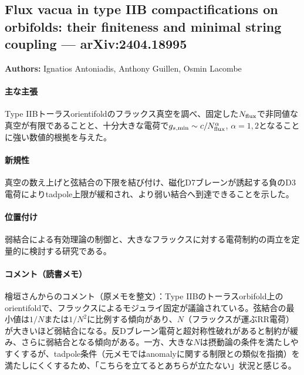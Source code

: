 \subsection{Flux vacua in type IIB compactifications on orbifolds: their finiteness and minimal string coupling --- arXiv:2404.18995}

\textbf{Authors:} Ignatios Antoniadis, Anthony Guillen, Osmin Lacombe

\paragraph{主な主張}
Type IIBトーラスorientifoldのフラックス真空を調べ、固定した\(N_{\rm flux}\)で非同値な真空が有限であることと、十分大きな電荷で\(g_{s,\min}\sim c/N_{\rm flux}^{\alpha}\), \(\alpha=1,2\)となることに強い数値的根拠を与えた。 \cite{Antoniadis:2024hqd}

\paragraph{新規性}
真空の数え上げと弦結合の下限を結び付け、磁化D7ブレーンが誘起する負のD3電荷によりtadpole上限が緩和され、より弱い結合へ到達できることを示した。

\paragraph{位置付け}
弱結合による有効理論の制御と、大きなフラックスに対する電荷制約の両立を定量的に検討する研究である。

\paragraph{コメント（読書メモ）}
檜垣さんからのコメント（原メモを整文）：Type IIBのトーラスorbifold上のorientifoldで、フラックスによるモジュライ固定が議論されている。弦結合の最小値は\(1/N\)または\(1/N^2\)に比例する傾向があり、\(N\)（フラックスが運ぶRR電荷）が大きいほど弱結合になる。反Dブレーン電荷と超対称性破れがあると制約が緩み、さらに弱結合となる傾向がある。一方、大きな\(N\)は摂動論の条件を満たしやすくするが、tadpole条件（元メモではanomalyに関する制限との類似を指摘）を満たしにくくするため、「こちらを立てるとあちらが立たない」状況と感じる。
